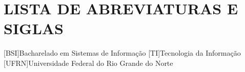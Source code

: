 \thispagestyle{empty}

\chapter*{\normalsize{\textbf{LISTA DE ABREVIATURAS E SIGLAS}}}


\begin{acronym}[]
    [BSI]{Bacharelado em Sistemas de Informação}
    [TI]{Tecnologia da Informação}
    [UFRN]{Universidade Federal do Rio Grande do Norte}       %
\end{acronym}